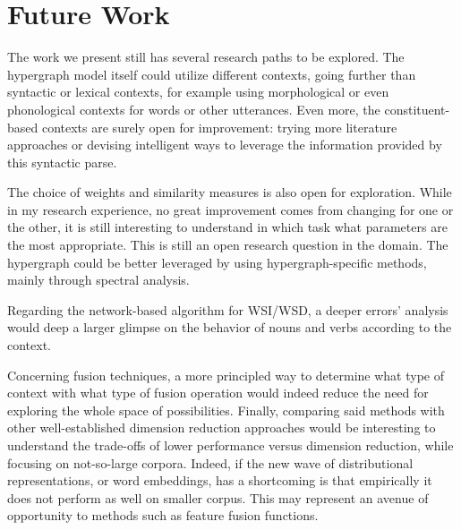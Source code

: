 \section{Future Work}
The work we present still has several research paths to be explored.
The hypergraph model itself could utilize different contexts, going further than syntactic or lexical contexts, for example using morphological or even phonological contexts for words or other utterances. Even more, the constituent-based contexts are surely open for improvement: trying more literature approaches or devising intelligent ways to leverage the information provided by this syntactic parse.

The choice of weights and similarity measures is also open for exploration. While in my research experience, no great improvement comes from changing for one or the other, it is still interesting to understand in which task what parameters are the most appropriate. This is still an open research question in the domain. The hypergraph could be better leveraged by using hypergraph-specific methods, mainly through spectral analysis.

Regarding the network-based algorithm for WSI/WSD, a deeper errors' analysis would deep a larger glimpse on the behavior of nouns and verbs according to the context.

Concerning fusion techniques, a more principled way to determine what type of context with what type of fusion operation would indeed reduce the need for exploring the whole space of possibilities. Finally,  comparing said methods with other well-established dimension reduction approaches would be interesting to understand the trade-offs of lower performance versus dimension reduction, while focusing on not-so-large corpora. Indeed, if the new wave of distributional representations, or word embeddings, has a shortcoming is that empirically it does not perform as well on smaller corpus. This may represent an avenue of opportunity to methods such as feature fusion functions.



